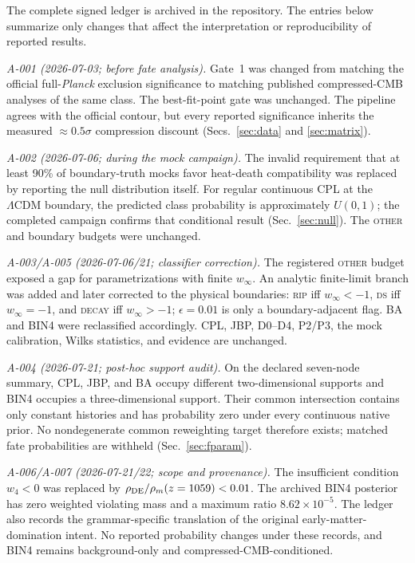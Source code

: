 \documentclass[a4paper,11pt]{article}
\newcommand{\lcdm}{\ensuremath{\Lambda\mathrm{CDM}}}
\begin{document}
The complete signed ledger is archived in the repository. The entries below
summarize only changes that affect the interpretation or reproducibility of
reported results.

\emph{A-001 (2026-07-03; before fate analysis).} Gate~1 was changed from
matching the official full-\textit{Planck} exclusion significance to matching
published compressed-CMB analyses of the same class. The best-fit-point gate
was unchanged. The pipeline agrees with the official contour, but every
reported significance inherits the measured $\approx0.5\sigma$ compression
discount (Secs.~\ref{sec:data} and \ref{sec:matrix}).

\emph{A-002 (2026-07-06; during the mock campaign).} The invalid requirement
that at least 90\% of boundary-truth mocks favor heat-death compatibility was
replaced by reporting the null distribution itself. For regular continuous
CPL at the \lcdm{} boundary, the predicted class probability is approximately
$U(0,1)$; the completed campaign confirms that conditional result
(Sec.~\ref{sec:null}). The \textsc{other} and boundary budgets were unchanged.

\emph{A-003/A-005 (2026-07-06/21; classifier correction).} The registered
\textsc{other} budget exposed a gap for parametrizations with finite
$w_\infty$. An analytic finite-limit branch was added and later corrected to
the physical boundaries: \textsc{rip} iff $w_\infty<-1$, \textsc{ds} iff
$w_\infty=-1$, and \textsc{decay} iff $w_\infty>-1$; $\epsilon=0.01$ is only
a boundary-adjacent flag. BA and BIN4 were reclassified accordingly. CPL,
JBP, D0--D4, P2/P3, the mock calibration, Wilks statistics, and evidence are
unchanged.

\emph{A-004 (2026-07-21; post-hoc support audit).} On the declared seven-node
summary, CPL, JBP, and BA occupy different two-dimensional supports and BIN4
occupies a three-dimensional support. Their common intersection contains only
constant histories and has probability zero under every continuous native
prior. No nondegenerate common reweighting target therefore exists; matched
fate probabilities are withheld (Sec.~\ref{sec:fparam}).

\emph{A-006/A-007 (2026-07-21/22; scope and provenance).} The insufficient
condition $w_4<0$ was replaced by
$\rho_{\rm DE}/\rho_m(z=1059)<0.01$. The archived BIN4 posterior has zero
weighted violating mass and a maximum ratio $8.62\times10^{-5}$. The ledger
also records the grammar-specific translation of the original early-matter-
domination intent. No reported probability changes under these records, and
BIN4 remains background-only and compressed-CMB-conditioned.
\end{document}
